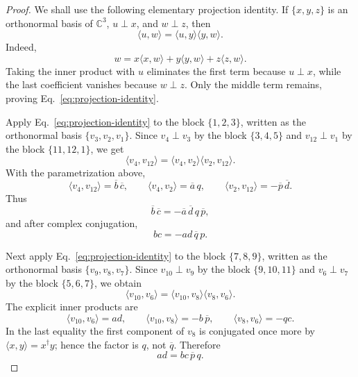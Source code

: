 \documentclass[aps,pra,twocolumn,superscriptaddress,10pt]{revtex4-2}
\newcommand{\C}{\mathbb{C}}
\begin{document}
\begin{proof}
We shall use the following elementary projection identity.  If
$\{x,y,z\}$ is an orthonormal basis of $\C^3$, $u\perp x$, and $w\perp z$,
then
\begin{equation}\label{eq:projection-identity}
    \langle u,w\rangle
    =\langle u,y\rangle\langle y,w\rangle.
\end{equation}
Indeed,
\[
    w=x\langle x,w\rangle+y\langle y,w\rangle+z\langle z,w\rangle.
\]
Taking the inner product with $u$ eliminates the first term because
$u\perp x$, while the last coefficient vanishes because $w\perp z$.
Only the middle term remains, proving Eq.~\eqref{eq:projection-identity}.

Apply Eq.~\eqref{eq:projection-identity} to the block $\{1,2,3\}$, written
as the orthonormal basis $\{v_3,v_2,v_1\}$.  Since $v_4\perp v_3$ by the
block $\{3,4,5\}$ and $v_{12}\perp v_1$ by the block $\{11,12,1\}$, we get
\begin{equation}\label{eq:g32-id-A}
    \langle v_4,v_{12}\rangle
    =\langle v_4,v_2\rangle\langle v_2,v_{12}\rangle.
\end{equation}
With the parametrization above,
\[
    \langle v_4,v_{12}\rangle=\overline b\,\overline c,
    \qquad
    \langle v_4,v_2\rangle=\overline a\,q,
    \qquad
    \langle v_2,v_{12}\rangle=-\overline p\,\overline d.
\]
Thus
\[
    \overline b\,\overline c
    =-\overline a\,\overline d\,q\,\overline p,
\]
and after complex conjugation,
\begin{equation}\label{eq:g32-constraint-1}
    bc=-ad\,\overline q\,p.
\end{equation}

Next apply Eq.~\eqref{eq:projection-identity} to the block $\{7,8,9\}$,
written as the orthonormal basis $\{v_9,v_8,v_7\}$.  Since
$v_{10}\perp v_9$ by the block $\{9,10,11\}$ and $v_6\perp v_7$ by the
block $\{5,6,7\}$, we obtain
\begin{equation}\label{eq:g32-id-B}
    \langle v_{10},v_6\rangle
    =\langle v_{10},v_8\rangle\langle v_8,v_6\rangle.
\end{equation}
The explicit inner products are
\[
    \langle v_{10},v_6\rangle=ad,
    \qquad
    \langle v_{10},v_8\rangle=-b\,\overline p,
    \qquad
    \langle v_8,v_6\rangle=-qc.
\]
In the last equality the first component of $v_8$ is conjugated once more by
$\langle x,y\rangle=x^\dagger y$; hence the factor is $q$, not $\overline q$.
Therefore
\begin{equation}\label{eq:g32-constraint-2}
    ad=bc\,\overline p\,q.
\end{equation}


\end{proof}
\end{document}
